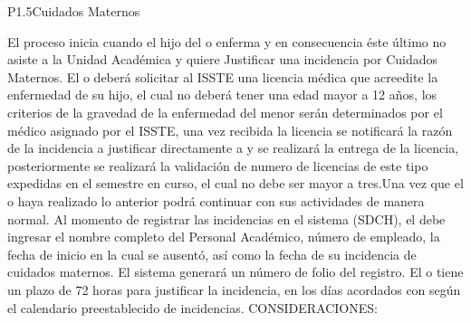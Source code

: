 

\begin{Proceso}{P1.5}{Cuidados Maternos} {
  
    \smallskip
    \bigskip 
    El proceso inicia cuando el hijo del  o  enferma y en consecuencia éste último no asiste a la Unidad Académica y quiere Justificar una incidencia por Cuidados Maternos. El  o  deberá solicitar al ISSTE una licencia médica que acreedite la enfermedad de su hijo, el cual no deberá tener una edad mayor a 12 años, los criterios de la gravedad de la enfermedad del menor serán determinados por el médico asignado por el ISSTE, una vez recibida la licencia se notificará la razón de la incidencia a justificar directamente a  y se realizará la entrega de la licencia, posteriormente se realizará la validación de numero de licencias de este tipo expedidas en el semestre en curso, el cual no debe ser mayor a tres.Una vez que el  o  haya realizado lo anterior podrá continuar con sus actividades de manera normal.
   Al momento de registrar las incidencias en el sistema (SDCH), el  debe ingresar el nombre completo del Personal Académico, número de empleado, la fecha de inicio en la cual se ausentó, así como la fecha de su incidencia de cuidados maternos. El sistema generará un número de folio del registro. 
   El  o  tiene un plazo de 72 horas para justificar la incidencia, en los días acordados con  según el calendario preestablecido de incidencias. \newline
   \newline CONSIDERACIONES:\\
}
\end{Proceso}
